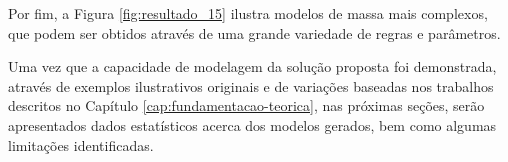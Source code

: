 \begin{figure}[h!]
	\centering
	\captionsetup{width=15cm}
	{}	
\end{figure}

\newpage

Por fim, a Figura \ref{fig:resultado_15} ilustra modelos de massa mais complexos, que podem ser obtidos através de uma grande variedade de regras e parâmetros.

\begin{figure}[h!]
	\centering
	\captionsetup{width=15cm}
	{}	
\end{figure}

Uma vez que a capacidade de modelagem da solução proposta foi demonstrada, através de exemplos ilustrativos originais e de variações baseadas nos trabalhos descritos no Capítulo \ref{cap:fundamentacao-teorica}, nas próximas seções, serão apresentados dados estatísticos acerca dos modelos gerados, bem como algumas limitações identificadas.

